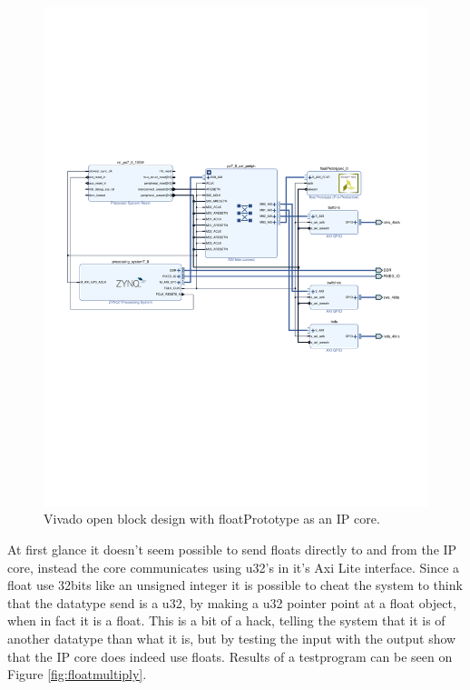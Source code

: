 \begin{figure}[H]
	\centering
	\includegraphics[trim={0 240 0 240},clip,width=1\linewidth]{diagram/VivadoBlockDesign_with_ip_core}
	\caption{Vivado open block design with floatPrototype as an IP core.}
	\label{fig:vivadoblockdesignwithipcore}
\end{figure}

At first glance it doesn't seem possible to send floats directly to and from the IP core, instead the core communicates using u32's in it's Axi Lite interface. Since a float use 32bits like an unsigned integer it is possible to cheat the system to think that the datatype send is a u32, by making a u32 pointer point at a float object, when in fact it is a float. This is a bit of a hack, telling the system that it is of another datatype than what it is, but by testing the input with the output show that the IP core does indeed use floats. Results of a testprogram can be seen on Figure \ref{fig:floatmultiply}.\\

